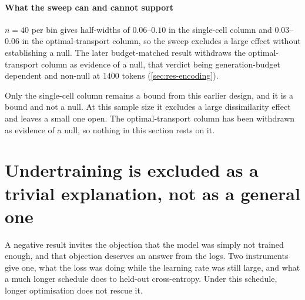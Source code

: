 \paragraph{What the sweep can and cannot support} $n=40$
per bin gives half-widths of $0.06$--$0.10$ in the single-cell column and
$0.03$--$0.06$ in the optimal-transport column, so the sweep excludes a large
effect without establishing a
null. The later budget-matched result withdraws the
optimal-transport column as evidence of a null, that verdict being
generation-budget dependent and non-null at $1400$ tokens
(\cref{sec:res-encoding}).

\begin{scopelimit}
Only the single-cell column remains a bound from this earlier design, and it is
a bound and not a null. At this sample size it excludes a large dissimilarity
effect and leaves a small one open. The optimal-transport column has been
withdrawn as evidence of a null, so nothing in this section rests on it.
\end{scopelimit}

\framedecl{-}
\section{Undertraining is excluded as a trivial explanation, not as a general one}
\label{sec:app-training}

\begin{question}
A negative result invites the objection that the model was simply not trained
enough, and that objection deserves an answer from the logs. Two instruments
give one, what the loss was doing while the learning rate was still large, and
what a much longer schedule does to held-out cross-entropy. Under this schedule,
longer optimisation does not rescue it.
\end{question}

